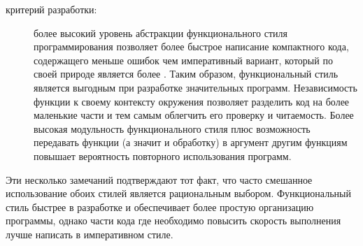 \begin{description}
	\item [критерий разработки:] более высокий уровень абстракции
функционального стиля программирования позволяет более быстрое написание
компактного кода, содержащего меньше ошибок чем императивный вариант, который по
своей природе является более . Таким образом, функциональный
стиль является выгодным при разработке значительных программ. Независимость
функции к своему контексту окружения позволяет разделить код на более маленькие
части и тем самым облегчить его проверку и читаемость. Более высокая модульность
функционального стиля плюс возможность передавать функции (а значит и обработку)
в аргумент другим функциям повышает вероятность повторного использования
программ.
\end{description}

Эти несколько замечаний подтверждают тот факт, что часто смешанное использование
обоих стилей является рациональным выбором. Функциональный стиль быстрее в
разработке и обеспечивает более простую организацию программы, однако части кода
где необходимо повысить скорость выполнения лучше написать в императивном стиле.